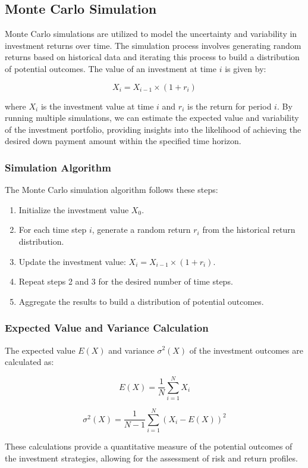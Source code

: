 \subsection{Monte Carlo Simulation}
Monte Carlo simulations are utilized to model the uncertainty and variability in investment returns over time. The simulation process involves generating random returns based on historical data and iterating this process to build a distribution of potential outcomes. The value of an investment at time \( i \) is given by:

\[
X_i = X_{i-1} \times (1 + r_i)
\]

where \( X_i \) is the investment value at time \( i \) and \( r_i \) is the return for period \( i \). By running multiple simulations, we can estimate the expected value and variability of the investment portfolio, providing insights into the likelihood of achieving the desired down payment amount within the specified time horizon.

\subsubsection{Simulation Algorithm}
The Monte Carlo simulation algorithm follows these steps:
\begin{enumerate}
    \item Initialize the investment value \( X_0 \).
    \item For each time step \( i \), generate a random return \( r_i \) from the historical return distribution.
    \item Update the investment value: \( X_i = X_{i-1} \times (1 + r_i) \).
    \item Repeat steps 2 and 3 for the desired number of time steps.
    \item Aggregate the results to build a distribution of potential outcomes.
\end{enumerate}

\subsubsection{Expected Value and Variance Calculation}
The expected value \( E(X) \) and variance \( \sigma^2(X) \) of the investment outcomes are calculated as:

\[
E(X) = \frac{1}{N} \sum_{i=1}^{N} X_i
\]

\[
\sigma^2(X) = \frac{1}{N - 1} \sum_{i=1}^{N} (X_i - E(X))^2
\]

These calculations provide a quantitative measure of the potential outcomes of the investment strategies, allowing for the assessment of risk and return profiles.

